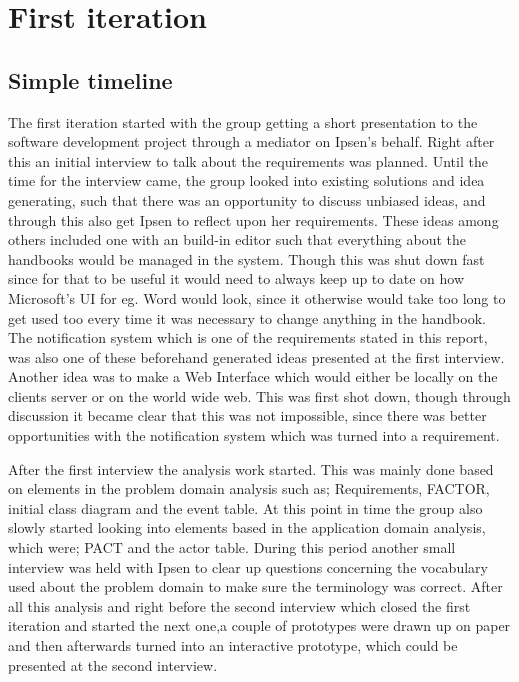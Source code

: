 \section{First iteration}\label{sec:Iteraton1}
\subsection{Simple timeline}
The first iteration started with the group getting a short presentation to the software development project through a mediator on Ipsen's behalf.
Right after this an initial interview to talk about the requirements was planned.
Until the time for the interview came, the group looked into existing solutions and idea generating, such that there was an opportunity to discuss unbiased ideas, and through this also get Ipsen to reflect upon her requirements.
These ideas among others included one with an build-in editor such that everything about the handbooks would be managed in the system.
Though this was shut down fast since for that to be useful it would need to always keep up to date on how Microsoft's UI for eg. Word would look, since it otherwise would take too long to get used too every time it was necessary to change anything in the handbook.
The notification system which is one of the requirements stated in this report, was also one of these beforehand generated ideas presented at the first interview. 
Another idea was to make a Web Interface which would either be locally on the clients server or on the world wide web. This was first shot down, though through discussion it became clear that this was not impossible, since there was better opportunities with the notification system which was turned into a requirement.

After the first interview the analysis work started.
This was mainly done based on elements in the problem domain analysis such as; Requirements, FACTOR, initial class diagram and the event table.
At this point in time the group also slowly started looking into elements based in the application domain analysis, which were; PACT and the actor table.
During this period another small interview was held with Ipsen to clear up questions concerning the vocabulary used about the problem domain to make sure the terminology was correct.
After all this analysis and right before the second interview which closed the first iteration and started the next one,a couple of prototypes were drawn up on paper and then afterwards turned into an interactive prototype, which could be presented at the second interview.

